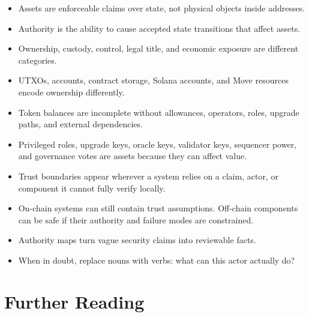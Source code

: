 \begin{itemize}
\tightlist
\item
  Assets are enforceable claims over state, not physical objects inside
  addresses.
\item
  Authority is the ability to cause accepted state transitions that
  affect assets.
\item
  Ownership, custody, control, legal title, and economic exposure are
  different categories.
\item
  UTXOs, accounts, contract storage, Solana accounts, and Move resources
  encode ownership differently.
\item
  Token balances are incomplete without allowances, operators, roles,
  upgrade paths, and external dependencies.
\item
  Privileged roles, upgrade keys, oracle keys, validator keys, sequencer
  power, and governance votes are assets because they can affect value.
\item
  Trust boundaries appear wherever a system relies on a claim, actor, or
  component it cannot fully verify locally.
\item
  On-chain systems can still contain trust assumptions. Off-chain
  components can be safe if their authority and failure modes are
  constrained.
\item
  Authority maps turn vague security claims into reviewable facts.
\item
  When in doubt, replace nouns with verbs: what can this actor actually
  do?
\end{itemize}

\section{Further Reading}

